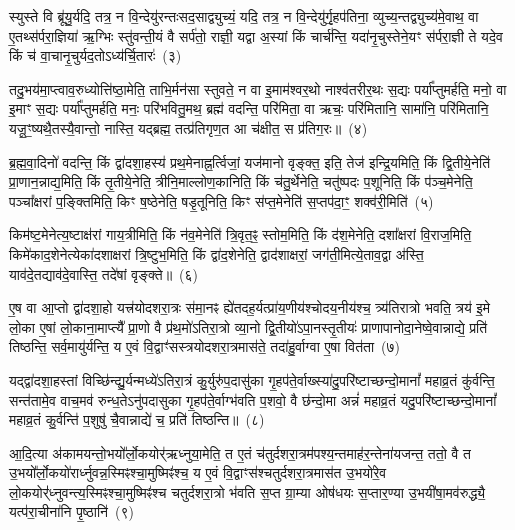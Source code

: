 स्युस्ते वि ब्रू॑यु॒र्यदि॒ तत्र॒ न वि॒न्देयु॑रन्तःसद॒साद्व्युच्यं॒ यदि॒ तत्र॒ न वि॒न्देयु॑र्गृ॒हप॑तिना॒ व्युच्य॒न्तद्व्युच्य॑मे॒वाथ॒ वा ए॒तथ्स॑र्परा॒ज्ञिया॑ ऋ॒ग्भिः स्तु॑वन्ती॒यं वै सर्प॑तो॒ राज्ञी॒ यद्वा अ॒स्यां किं चार्च॑न्ति॒ यदा॑नृ॒चुस्तेने॒यꣳ स॑र्परा॒ज्ञी ते यदे॒व किं च॑ वा॒चानृ॒चुर्यद॒तो\-ऽध्य॑र्चि॒तारः॑~(३)

तदु॒भय॑मा॒प्त्वाव॒रुध्योत्ति॑ष्ठा॒मेति॒ ताभि॒र्मन॑सा स्तुवते॒ न वा इ॒माम॑श्वर॒थो नाश्व॑तरीर॒थः स॒द्यः पर्या᳚प्तुमर्\mbox{}हति॒ मनो॒ वा इ॒माꣳ स॒द्यः पर्या᳚प्तुमर्\mbox{}हति॒ मनः॒ परि॑भवितु॒मथ॒ ब्रह्म॑ वदन्ति॒ परि॑मिता॒ वा ऋचः॒ परि॑मितानि॒ सामा॑नि॒ परि॑मितानि॒ यजू॒ꣳ॒ष्यथै॒तस्यै॒वान्तो॒ नास्ति॒ यद्ब्रह्म॒ तत्प्र॑तिगृण॒त आ च॑क्षीत॒ स प्र॑तिग॒रः॥~(४)

{\anuvakamend[{व्याह॒ स दृ॑शी॒कवो᳚\-ऽर्चि॒तारः॒ स एक॑ञ्च}]}%

ब्र॒ह्म॒वा॒दिनो॑ वदन्ति॒ किं द्वा॑दशा॒हस्य॑ प्रथ॒मेनाह्न॒र्त्विजां॒ यज॑मानो वृङ्क्त॒ इति॒ तेज॑ इन्द्रि॒यमिति॒ किं द्वि॒तीये॒नेति॑ प्रा॒णान॒न्नाद्य॒मिति॒ किं तृ॒तीये॒नेति॒ त्रीनि॒माल्लोण॒कानिति॒ किं च॑तु॒र्थेनेति॒ चतु॑ष्पदः प॒शूनिति॒ किं प॑ञ्च॒मेनेति॒ पञ्चा᳚क्षरां प॒ङ्क्तिमिति॒ किꣳ ष॒ष्ठेनेति॒ षडृ॒तूनिति॒ किꣳ स॑प्त॒मेनेति॑ स॒प्तप॑दा॒ꣳ॒ शक्व॑री॒मिति॑~(५)

किम॑ष्ट॒मेनेत्य॒ष्टाक्ष॑रां गाय॒त्रीमिति॒ किं न॑व॒मेनेति॑ त्रि॒वृत॒ꣴ॒ स्तोम॒मिति॒ किं द॑श॒मेनेति॒ दशा᳚क्षरां वि॒राज॒मिति॒ किमे॑काद॒शेनेत्येका॑\-दशाक्षरां त्रि॒ष्टुभ॒मिति॒ किं द्वा॑द॒शेनेति॒ द्वाद॑शाक्षरां॒ जग॑ती॒मित्ये॒ताव॒द्वा अ॑स्ति॒ याव॑दे॒तद्याव॑दे॒वास्ति॒ तदे॑षां वृङ्क्ते॥~(६)

{\anuvakamend[{शक्व॑री॒मित्येक॑चत्वारिꣳशच्च}]}%

ए॒ष वा आ॒प्तो द्वा॑दशा॒हो यत्त्र॑योदशरा॒त्रः स॑मा॒नꣴ ह्ये॑तदह॒र्यत्प्रा॑य॒णीय॑श्चोदय॒नीय॑श्च॒ त्र्य॑तिरात्रो भवति॒ त्रय॑ इ॒मे लो॒का ए॒षां लो॒काना॒माप्त्यै᳚ प्रा॒णो वै प्र॑थ॒मो॑\-ऽतिरा॒त्रो व्या॒नो द्वि॒तीयो॑\-ऽपा॒नस्तृ॒तीयः॑ प्राणापानोदा॒नेष्वे॒वान्नाद्ये॒ प्रति॑ तिष्ठन्ति॒ सर्व॒मायु॑र्यन्ति॒ य ए॒वं वि॒द्वाꣳ॑सस्त्रयोदशरा॒त्रमास॑ते॒ तदा॑हु॒र्वाग्वा ए॒षा वित॑ता~(७)

यद्द्वा॑दशा॒हस्तां विच्छि॑न्द्यु॒र्यन्मध्ये॑\-ऽतिरा॒त्रं कु॒र्युरु॑प॒दासु॑का गृ॒हप॑ते॒र्वाख्स्या॑दु॒परि॑ष्टाच्छन्दो॒मानां᳚ महाव्र॒तं कु॑र्वन्ति॒ सन्त॑तामे॒व वाच॒मव॑ रुन्ध॒ते\-ऽनु॑पदासुका गृ॒हप॑ते॒र्वाग्भ॑वति प॒शवो॒ वै छ॑न्दो॒मा अन्नं॑ महाव्र॒तं यदु॒परि॑ष्टाच्छन्दो॒मानां᳚ महाव्र॒तं कु॒र्वन्ति॑ प॒शुषु॑ चै॒वान्नाद्ये॑ च॒ प्रति॑ तिष्ठन्ति॥~(८)

{\anuvakamend[{वित॑ता॒ त्रिच॑त्वारिꣳशच्च}]}%

आ॒दि॒त्या अ॑कामयन्तो॒भयो᳚र्लो॒कयोर्॑ऋध्नुया॒मेति॒ त ए॒तं च॑तुर्दशरा॒त्रम॑पश्य॒न्तमाह॑र॒न्तेना॑यजन्त॒ ततो॒ वै त उ॒भयो᳚र्लो॒कयो॑रार्ध्नुवन्न॒स्मिꣴश्चा॒मुष्मिꣴ॑श्च॒ य ए॒वं वि॒द्वाꣳस॑श्चतुर्दशरा॒त्रमास॑त उ॒भयो॑रे॒व लो॒कयोर्॑\mbox{}॑ध्नुवन्त्य॒\-स्मिꣴश्चा॒मुष्मिꣴ॑श्च चतुर्दशरा॒त्रो भ॑वति स॒प्त ग्रा॒म्या ओष॑धयः स॒प्तार॒ण्या उ॒भयी॑षा॒मव॑रुद्ध्यै॒ यत्प॑रा॒चीना॑नि पृ॒ष्ठानि॑~(९)


